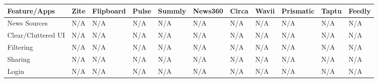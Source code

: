 \begin{center}
    \begin{tabular}{ | l | l | l | l | l | l | l | l | l | l | l |}
    \hline
    Feature/Apps & Zite & Flipboard & Pulse & Summly & News360 & Circa & Wavii & Prismatic & Taptu & Feedly \\ \hline
     
    News Sources & N/A & N/A & N/A & N/A & N/A & N/A & N/A & N/A & N/A & N/A  \\ \hline
     
    Clear/Cluttered UI & N/A & N/A & N/A & N/A & N/A & N/A & N/A & N/A & N/A & N/A  \\ \hline
     
    Filtering & N/A & N/A & N/A & N/A & N/A & N/A & N/A & N/A & N/A & N/A  \\ \hline

    Sharing & N/A & N/A & N/A & N/A & N/A & N/A & N/A & N/A & N/A & N/A  \\ \hline

    Login & N/A & N/A & N/A & N/A & N/A & N/A & N/A & N/A & N/A & N/A  \\ \hline
    \end{tabular}
\end{center}

